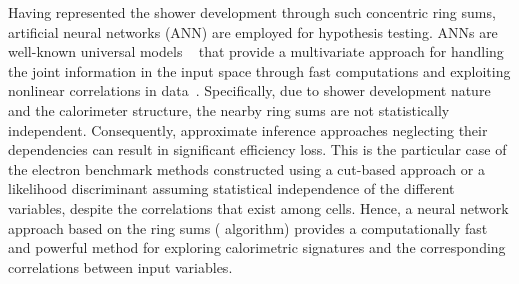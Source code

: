 Having represented the shower development through such concentric ring sums,  artificial neural networks (ANN) are employed for hypothesis testing.  ANNs are well-known universal models ~\cite{haykin_2008} that provide a multivariate approach for handling the joint information in the input space through fast computations and exploiting nonlinear correlations in data~\cite{Duda}. Specifically, due to shower development nature and the calorimeter structure, the nearby ring sums are not statistically independent. Consequently, approximate inference approaches neglecting their dependencies can result in significant efficiency loss. This is the particular case of the electron benchmark methods constructed using a cut-based approach or a likelihood discriminant assuming statistical independence of the different variables, despite the correlations that exist among cells.  Hence, a neural network approach based on the ring sums (\rnn{} algorithm) provides a computationally fast and powerful method for exploring calorimetric signatures and the corresponding correlations between input variables. 




